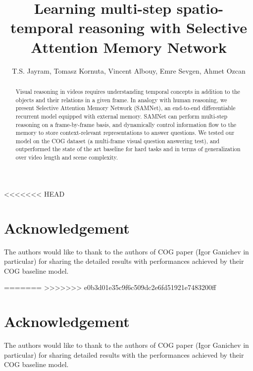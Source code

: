 \documentclass{article}
\title{Learning multi-step spatio-temporal reasoning with Selective Attention Memory Network}
\author{T.S. Jayram, Tomasz Kornuta, Vincent Albouy, Emre Sevgen, Ahmet Ozcan}
\theoremstyle{remark}
\theoremstyle{definition}
\begin{document}
\maketitle
\begin{abstract}
Visual reasoning in videos requires understanding temporal concepts in addition to the objects and their relations in a given frame.  
In analogy with human reasoning, we present Selective Attention Memory Network (SAMNet), an end-to-end differentiable recurrent 
model equipped with external memory.  
SAMNet can perform multi-step reasoning on a frame-by-frame basis, and dynamically control information flow to the memory 
to store context-relevant representations to answer questions. 
We tested our model on the COG dataset (a multi-frame visual question answering test), and outperformed the state of 
the art baseline for hard tasks and in terms of generalization over video length and scene complexity.
\end{abstract}






<<<<<<< HEAD
\section*{Acknowledgement}
The authors would like to thank to the authors of COG paper (Igor Ganichev in particular) for sharing the detailed results with performances achieved by their COG baseline model.
	
=======
>>>>>>> e0b3d01e35c9f6c509dc2e6fd51921e7483200ff
\newpage



%

\section*{Acknowledgement}
The authors would like to thank to the authors of COG paper (Igor Ganichev in particular) for sharing detailed results with the performances achieved by their COG baseline model.
	
\end{document}
